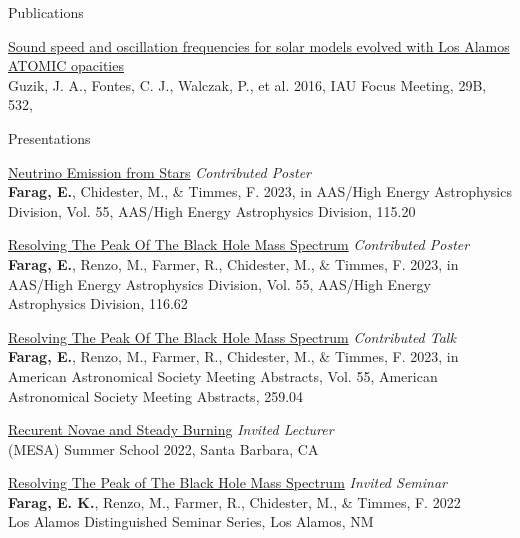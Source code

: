 \documentclass{resume} %
\begin{document}
\begin{rSection}{Publications}
\begin{revnumerate}
\item \href{https://doi.org/10.1017/S1743921316006062}{Sound speed and oscillation frequencies for solar models evolved with Los Alamos ATOMIC opacities}
\\ Guzik, J. A., Fontes, C. J., Walczak, P., et al. 2016, IAU Focus Meeting, 29B, 532,


\end{revnumerate}



\end{rSection}


\begin{rSection}{Presentations}
\begin{revnumerate}

\item \href{https://ui.adsabs.harvard.edu/abs/2023HEAD...2011520F/abstract}{Neutrino Emission from Stars} \hfill {\em Contributed Poster}
\\ \textbf{Farag, E.}, Chidester, M., \& Timmes, F. 2023, in AAS/High Energy Astrophysics Division, Vol. 55, AAS/High Energy Astrophysics Division, 115.20


\item \href{https://ui.adsabs.harvard.edu/abs/2023HEAD...2011662F/abstract}{Resolving The Peak Of The Black Hole Mass Spectrum} \hfill {\em Contributed Poster}
\\ \textbf{Farag, E.}, Renzo, M., Farmer, R., Chidester, M., \& Timmes, F. 2023, in AAS/High Energy Astrophysics Division, Vol. 55, AAS/High Energy Astrophysics Division, 116.62

\item \href{https://ui.adsabs.harvard.edu/abs/2023AAS...24125904F/abstract}{Resolving The Peak Of The Black Hole Mass Spectrum} \hfill {\em Contributed Talk}
\\ \textbf{Farag, E.}, Renzo, M., Farmer, R., Chidester, M., \& Timmes, F. 2023, in American Astronomical Society Meeting Abstracts, Vol. 55, American Astronomical Society Meeting Abstracts, 259.04 


\item \href{https://mesahub.github.io/summer-school-2022/}{Recurent Novae and Steady Burning} \hfill {\em Invited Lecturer} 
\\(MESA) Summer School 2022, Santa Barbara, CA 

\item \href{https://doi.org/10.2172/1876778}{Resolving The Peak of The Black Hole Mass Spectrum} \hfill {\em Invited Seminar}
\\ \textbf{Farag, E. K.}, Renzo, M., Farmer, R., Chidester, M., \& Timmes, F. 2022
\\ Los Alamos Distinguished Seminar Series, Los Alamos, NM 


\end{revnumerate}
\end{rSection}
\end{document}
